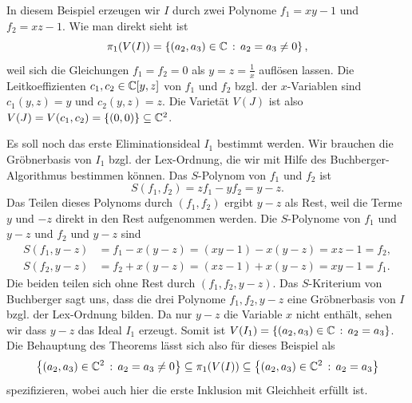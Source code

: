 \documentclass[11pt]{article}
\numberwithin{equation}{section}
\begin{document}
\begin{beispiel}
	In diesem Beispiel erzeugen wir $I$ durch zwei Polynome $f_1 = xy - 1$ und $f_2 = x z - 1$. Wie man direkt sieht ist 
	\[
		 \pi_1(V(I)) = \left\{  (a_2, a_3) \in \mathbb{C} \,:\,  a_2 = a_3 \ne 0 \right\},  
	\]
	weil sich die Gleichungen $f_1 = f_2 = 0$  als $y = z = \frac{1}{x}$ auflösen lassen. Die Leitkoeffizienten $c_1,c_2 \in \mathbb{C}[y,z]$ von $f_1$ und $f_2$ bzgl. der $x$-Variablen sind $c_1(y,z) = y$ und $c_2(y,z) = z$. Die Varietät $V(J)$ ist also $V(J) = V(c_1, c_2) = \{(0,0) \} \subseteq \mathbb{C}^2$. 
	
	Es soll noch das erste Eliminationsideal $I_1$ bestimmt werden. Wir brauchen die Gröbnerbasis von $I_1$ bzgl. der Lex-Ordnung, die wir mit Hilfe des Buchberger-Algorithmus bestimmen können. Das $S$-Polynom von $f_1$ und $f_2$ ist 
	\[
		S(f_1, f_2) = z f_1 - y f_2 = y -z. 
	\]
	Das Teilen dieses Polynoms durch $(f_1, f_2)$ ergibt $y-z$ als Rest, weil die Terme $y$ und $-z$ direkt in den Rest aufgenommen werden. Die $S$-Polynome von $f_1$ und $y-z$ und $f_2$ und $y-z$ sind 
	\begin{align*}
			S(f_1, y-z) & = f_1 - x (y-z) = (xy-1) - x (y-z) = x z - 1 = f_2, 
			\\ S(f_2, y-z) & = f_2 + x (y-z) = (xz-1) + x(y-z) = xy - 1 = f_1.
	\end{align*} 
	Die beiden teilen sich ohne Rest durch $(f_1, f_2, y-z)$. Das $S$-Kriterium von Buchberger sagt uns, dass die drei Polynome $f_1, f_2, y-z$ eine Gröbnerbasis von $I$ bzgl. der Lex-Ordnung bilden. Da nur $y-z$ die Variable $x$ nicht enthält, sehen wir dass $y-z$ das Ideal $I_1$ erzeugt. Somit ist $V(I_1) = \left\{  (a_2,a_3) \in \mathbb{C} \,:\, a_2 = a_3 \right\}$. Die Behauptung des Theorems lässt sich also für dieses Beispiel als 
	\[
		\left\{  (a_2, a_3) \in \mathbb{C}^2 \,:\, a_2 = a_3 \ne 0 \right\} \subseteq \pi_1(V(I)) \subseteq \left\{  (a_2,a_3) \in \mathbb{C}^2 \,:\, a_2 = a_3 \right\}
	\]
	spezifizieren, wobei auch hier die erste Inklusion mit Gleichheit erfüllt ist. 
\end{beispiel} 
\end{document}
